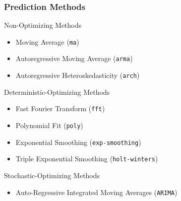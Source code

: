 \begin{frame}
    \frametitle{\deploy Prediction Methods}
    Non-Optimizing Methods 
    \begin{itemize}
        \item Moving Average (\texttt{ma})
        \item Autoregressive Moving Average (\texttt{arma})
        \item Autoregressive Heteroskedasticity (\texttt{arch})
    \end{itemize}
    Deterministic-Optimizing Methods 
    \begin{itemize}
        \item Fast Fourier Transform (\texttt{fft})
        \item Polynomial Fit (\texttt{poly})
        \item Exponential Smoothing (\texttt{exp-smoothing})
        \item Triple Exponential Smoothing (\texttt{holt-winters})
    \end{itemize}
    Stochastic-Optimizing Methods 
    \begin{itemize}
        \item Auto-Regressive Integrated Moving Averages (\texttt{ARIMA})
    \end{itemize}
\end{frame}